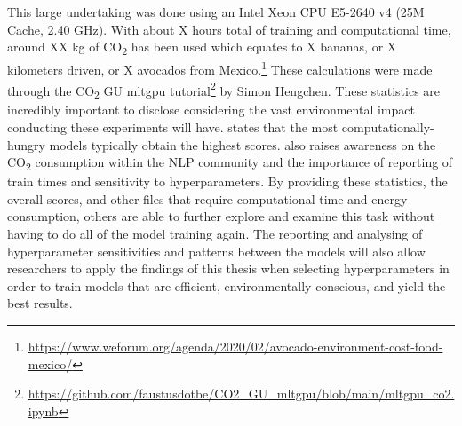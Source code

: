 This large undertaking was done using an Intel Xeon CPU E5-2640 v4 (25M Cache, 2.40 GHz). With about X hours total of training and computational time, around XX kg of CO\textsubscript{2} has been used which equates to X bananas, or X kilometers driven, or X avocados from Mexico.\footnote{\url{https://www.weforum.org/agenda/2020/02/avocado-environment-cost-food-mexico/}} These calculations were made through the CO\textsubscript{2} GU mltgpu tutorial\footnote{\url{https://github.com/faustusdotbe/CO2_GU_mltgpu/blob/main/mltgpu_co2.ipynb}} by Simon Hengchen. These statistics are incredibly important to disclose considering the vast environmental impact conducting these experiments will have. 
\citet{strubell-etal-2019-energy} states that the most computationally-hungry models typically obtain the highest scores. \citet{strubell-etal-2019-energy} also raises awareness on the CO\textsubscript{2} consumption within the NLP community and the importance of reporting of train times and sensitivity to hyperparameters. By providing these statistics, the overall scores, and other files that require computational time and energy consumption, others are able to  further explore and examine this task without having to do all of the model training again. The reporting and analysing of hyperparameter sensitivities and patterns between the models will also allow researchers to apply the findings of this thesis when selecting hyperparameters in order to train models that are efficient, environmentally conscious, and yield the best results.

